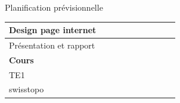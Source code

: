 \documentclass{beamer}
\begin{document}
\begin{frame}{Planification prévisionnelle}
\begin{table}
\begin{tabular}{l|l|l|l|l|l|l|l|l|l|}
            Design page internet             &                                   & \cellcolor{o}                     & \cellcolor{o}                     &                                   & \cellcolor{o}                     & \cellcolor{o}                     & \cellcolor{o}                     &                                   &                                   \\ \hline
            Présentation et rapport          &                                   &                                   &                                   &                                   &                                   &                                   & \cellcolor{o}                     &                                   & \cellcolor{o}                     \\ \hline \hline
            \textbf{Cours}                   &                                   &                                   &                                   &                                   &                                   &                                   &                                   &                                   &                                   \\ \hline
            TE1                              &                                   &                                   &                                   & \cellcolor{o}                     &                                   &                                   &                                   &                                   &                                   \\ \hline
            swisstopo                        &                                   &                                   &                                   &                                   &                                   &                                   &                                   & \cellcolor{o}                     &                                   \\ \hline
            \hline
        \end{tabular}
    \end{table}
\end{frame}
\end{document}
